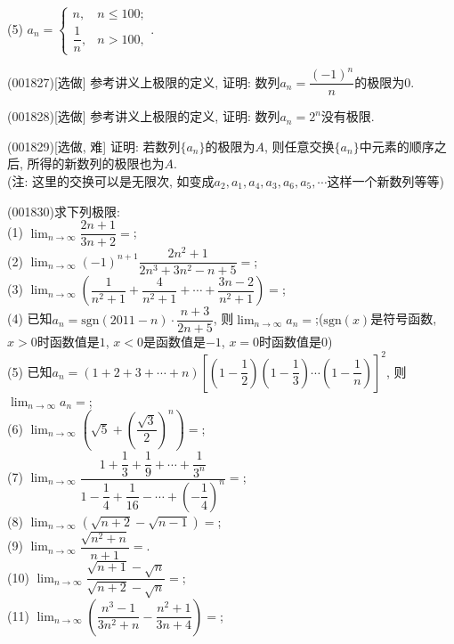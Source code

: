 (5) $a_n=\left\{\begin{array}{ll}n,& n\leq 100;\\\dfrac{1}{n},& n>100,\end{array}\right.$.
\item (001827)[选做]
参考讲义上极限的定义, 证明: 数列$a_n=\dfrac{(-1)^n}{n}$的极限为$0$.
\item (001828)[选做]
参考讲义上极限的定义, 证明: 数列$a_n=2^n$没有极限.
\item (001829)[选做, 难]
证明: 若数列$\{a_n\}$的极限为$A$, 则任意交换$\{a_n\}$中元素的顺序之后, 所得的新数列的极限也为$A$.\\ 
(注: 这里的交换可以是无限次, 如变成$a_2,a_1,a_4,a_3,a_6,a_5,\cdots$这样一个新数列等等)
\item (001830)求下列极限:\\ 
(1) $\displaystyle\lim_{n\rightarrow \infty} \dfrac{2n+1}{3n+2}=$;\\ 
(2) $\displaystyle\lim_{n\rightarrow \infty} (-1)^{n+1}\dfrac{2n^2+1}{2n^3+3n^2-n+5}=$;\\ 
(3) $\displaystyle\lim_{n\rightarrow \infty} \left(\dfrac{1}{n^2+1}+\dfrac{4}{n^2+1}+\cdots+\dfrac{3n-2}{n^2+1}\right)=$;\\ 
(4) 已知$a_n=\mathrm{sgn} (2011-n)\cdot \dfrac{n+3}{2n+5}$, 则$\displaystyle\lim_{n\rightarrow \infty} a_n=$;($\mathrm{sgn}(x)$是符号函数, $x>0$时函数值是$1$, $x<0$是函数值是$-1$, $x=0$时函数值是$0$)\\ 
(5) 已知$a_n=(1+2+3+\cdots+n)\left[\left(1-\dfrac 12\right)\left(1-\dfrac 13\right)\cdots\left(1-\dfrac 1n\right)\right]^2$, 则$\displaystyle\lim_{n\rightarrow \infty} a_n=$;\\ 
(6) $\displaystyle\lim_{n\rightarrow \infty} \left(\sqrt{5}+\left(\dfrac{\sqrt{3}}2\right)^n\right)=$;\\ 
(7) $\displaystyle\lim_{n\rightarrow \infty} \dfrac{1+\dfrac 13+\dfrac 19+\cdots+\dfrac 1{3^n}}{1-\dfrac 14+\dfrac 1{16}-\cdots +\left(-\dfrac{1}{4}\right)^n}=$;\\ 
(8) $\displaystyle\lim_{n\rightarrow \infty} (\sqrt{n+2}-\sqrt{n-1})=$;\\ 
(9) $\displaystyle\lim_{n\rightarrow \infty}\dfrac{\sqrt{n^2+n}}{n+1}=$.\\ 
(10) $\displaystyle\lim_{n\rightarrow \infty}\dfrac{\sqrt{n+1}-\sqrt{n}}{\sqrt{n+2}-\sqrt{n}}=$;\\ 
(11) $\displaystyle\lim_{n\rightarrow \infty} \left(\dfrac{n^3-1}{3n^2+n}-\dfrac{n^2+1}{3n+4}\right)=$;\\ 
